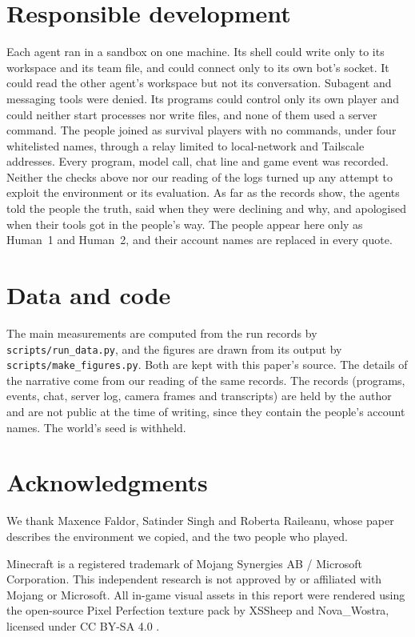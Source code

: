 \documentclass[11pt,a4paper]{article}
\begin{document}
\section{Responsible development}

Each agent ran in a sandbox on one machine. Its shell could write only to its workspace and its team file, and could connect only to its own bot's socket. It could read the other agent's workspace but not its conversation. Subagent and messaging tools were denied. Its programs could control only its own player and could neither start processes nor write files, and none of them used a server command. The people joined as survival players with no commands, under four whitelisted names, through a relay limited to local-network and Tailscale addresses. Every program, model call, chat line and game event was recorded. Neither the checks above nor our reading of the logs turned up any attempt to exploit the environment or its evaluation. As far as the records show, the agents told the people the truth, said when they were declining and why, and apologised when their tools got in the people's way. The people appear here only as Human~1 and Human~2, and their account names are replaced in every quote.

\section*{Data and code}

The main measurements are computed from the run records by \texttt{scripts/run\_data.py}, and the figures are drawn from its output by \texttt{scripts/make\_figures.py}. Both are kept with this paper's source. The details of the narrative come from our reading of the same records. The records (programs, events, chat, server log, camera frames and transcripts) are held by the author and are not public at the time of writing, since they contain the people's account names. The world's seed is withheld.

\section*{Acknowledgments}

We thank Maxence Faldor, Satinder Singh and Roberta Raileanu, whose paper describes the environment we copied, and the two people who played.

Minecraft is a registered trademark of Mojang Synergies AB / Microsoft Corporation. This independent research is not approved by or affiliated with Mojang or Microsoft. All in-game visual assets in this report were rendered using the open-source Pixel Perfection texture pack by XSSheep and Nova\_Wostra, licensed under CC BY-SA 4.0 \citep{pixelperfection}.
\end{document}
